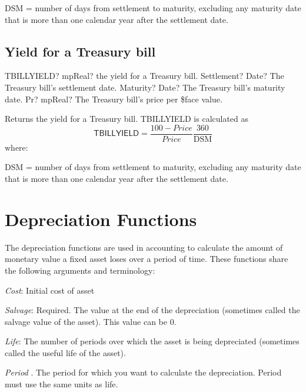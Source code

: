 DSM  = number of days from settlement to maturity, excluding any maturity date that is more than one calendar year after the settlement date.




\subsection{Yield for a Treasury bill}

\begin{mpFunctionsExtract}
	\mpWorksheetFunctionThreeNotImplemented
	{TBILLYIELD? mpReal? the yield for a Treasury bill.}
	{Settlement? Date?  The Treasury bill's settlement date.}
	{Maturity? Date? The Treasury bill's maturity date.}
	{Pr? mpReal? The Treasury bill's price per \$face value.}
\end{mpFunctionsExtract}

\vspace{0.3cm}
Returns the yield for a Treasury bill. TBILLYIELD is calculated as
\begin{equation}
	\textsf{TBILLYIELD} = \frac{100-Price}{Price} \frac{360}{\text{DSM}}
\end{equation}
where:

DSM  = number of days from settlement to maturity, excluding any maturity date that is more than one calendar year after the settlement date.





\newpage
\section{Depreciation Functions}



\label{DepreciationFunctions}

The depreciation functions are used in accounting to calculate the amount of monetary value a fixed asset loses over a period of time. These functions share the following arguments and terminology:

\textit{Cost}: Initial cost of asset

\textit{Salvage}: Required. The value at the end of the depreciation (sometimes called the salvage value of the asset). This value can be 0.

\textit{Life}: The number of periods over which the asset is being depreciated (sometimes called the useful life of the asset).

\textit{Period} . The period for which you want to calculate the depreciation. Period must use the same units as life.

